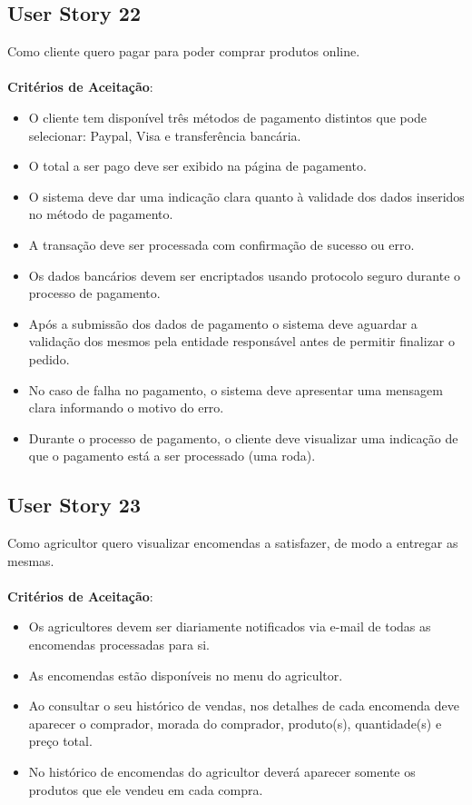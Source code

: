 \documentclass[a4paper,11pt]{article}
\begin{document}
\subsection{User Story 22}
Como cliente quero pagar para poder comprar produtos online.\\\\
\textbf{Critérios de Aceitação}:
\begin{itemize}
  \item O cliente tem disponível três métodos de pagamento distintos que pode selecionar: Paypal, Visa e transferência bancária.
  \item O total a ser pago deve ser exibido na página de pagamento.
  \item O sistema deve dar uma indicação clara quanto à validade dos dados inseridos no método de pagamento.
  \item A transação deve ser processada com confirmação de sucesso ou erro.
  \item Os dados bancários devem ser encriptados usando protocolo seguro durante o processo de pagamento.
  \item Após a submissão dos dados de pagamento o sistema deve aguardar a validação dos mesmos pela entidade responsável antes de permitir finalizar o pedido.
  \item No caso de falha no pagamento, o sistema deve apresentar uma mensagem clara informando o motivo do erro.
  \item Durante o processo de pagamento, o cliente deve visualizar uma indicação de que o pagamento está a ser processado (uma roda).
\end{itemize}
\subsection{User Story 23}
Como agricultor quero visualizar encomendas a satisfazer, de modo a entregar as mesmas.\\\\
\textbf{Critérios de Aceitação}:
\begin{itemize}
  \item Os agricultores devem ser diariamente notificados via e-mail de todas as encomendas processadas para si.
  \item As encomendas estão disponíveis no menu do agricultor.
  \item Ao consultar o seu histórico de vendas, nos detalhes de cada encomenda deve aparecer o comprador, morada do comprador, produto(s), quantidade(s) e preço total.
  \item No histórico de encomendas do agricultor deverá aparecer somente os produtos que ele vendeu em cada compra.
\end{itemize}
\end{document}
